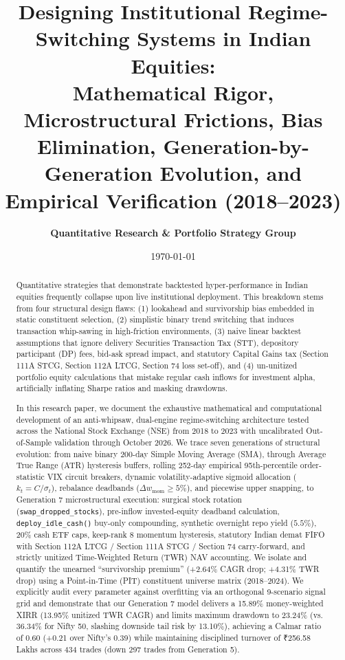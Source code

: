 \documentclass[11pt,a4paper]{article}
\title{\LARGE\textbf{Designing Institutional Regime-Switching Systems in Indian Equities:}\\
\large Mathematical Rigor, Microstructural Frictions, Bias Elimination, Generation-by-Generation Evolution, and Empirical Verification (2018--2023)}
\author{\textbf{Quantitative Research \& Portfolio Strategy Group}}
\date{\today}
\begin{document}
\maketitle

\begin{abstract}
Quantitative strategies that demonstrate backtested hyper-performance in Indian equities frequently collapse upon live institutional deployment. This breakdown stems from four structural design flaws: (1) lookahead and survivorship bias embedded in static constituent selection, (2) simplistic binary trend switching that induces transaction whip-sawing in high-friction environments, (3) naive linear backtest assumptions that ignore delivery Securities Transaction Tax (STT), depository participant (DP) fees, bid-ask spread impact, and statutory Capital Gains tax (Section 111A STCG, Section 112A LTCG, Section 74 loss set-off), and (4) un-unitized portfolio equity calculations that mistake regular cash inflows for investment alpha, artificially inflating Sharpe ratios and masking drawdowns.

In this research paper, we document the exhaustive mathematical and computational development of an anti-whipsaw, dual-engine regime-switching architecture tested across the National Stock Exchange (NSE) from 2018 to 2023 with uncalibrated Out-of-Sample validation through October 2026. We trace seven generations of structural evolution: from naive binary 200-day Simple Moving Average (SMA), through Average True Range (ATR) hysteresis buffers, rolling 252-day empirical 95th-percentile order-statistic VIX circuit breakers, dynamic volatility-adaptive sigmoid allocation ($k_t = C/\sigma_t$), rebalance deadbands ($\Delta w_{\text{mom}} \ge 5\%$), and piecewise upper snapping, to Generation 7 microstructural execution: surgical stock rotation (\texttt{swap\_dropped\_stocks}), pre-inflow invested-equity deadband calculation, \texttt{deploy\_idle\_cash()} buy-only compounding, synthetic overnight repo yield ($5.5\%$), 20\% cash ETF caps, keep-rank 8 momentum hysteresis, statutory Indian demat FIFO with Section 112A LTCG / Section 111A STCG / Section 74 carry-forward, and strictly unitized Time-Weighted Return (TWR) NAV accounting. We isolate and quantify the unearned ``survivorship premium'' (+2.64\% CAGR drop; +4.31\% TWR drop) using a Point-in-Time (PIT) constituent universe matrix (2018--2024). We explicitly audit every parameter against overfitting via an orthogonal 9-scenario signal grid and demonstrate that our Generation 7 model delivers a 15.89\% money-weighted XIRR (13.95\% unitized TWR CAGR) and limits maximum drawdown to 23.24\% (vs. 36.34\% for Nifty 50, slashing downside tail risk by 13.10\%), achieving a Calmar ratio of 0.60 (+0.21 over Nifty's 0.39) while maintaining disciplined turnover of ₹256.58 Lakhs across 434 trades (down 297 trades from Generation 5).
\end{abstract}
\end{document}
